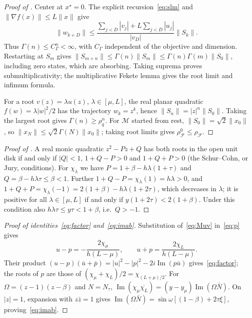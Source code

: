\documentclass[11pt]{article}
\theoremstyle{definition}
\theoremstyle{remark}
\newcommand{\cF}{\mathcal F}
\newcommand{\cM}{\mathcal M}
\newcommand{\Ima}{\operatorname{Im}}
\newcommand{\norm}[1]{\lVert #1\rVert}
\newcommand{\rhoF}{\rho_{\cF}}
\newcommand{\rhoz}{\rho_{\cF}^{0}}
\begin{document}
\begin{proof}[Proof of ]
Center at \(x^\star=0\).  The explicit recursion~\eqref{eq:slm} and
\(\norm{\nabla f(x)}\le L\norm x\) give
\[
\norm{w_{k+D}}\le
\frac{\sum_{j<D}|v_j|+L\sum_{j<D}|u_j|}{|v_D|}\norm{S_k}.
\]
Thus \(\Gamma(n)\le C_\Gamma^n<\infty\), with \(C_\Gamma\) independent of the objective and dimension.
Restarting at \(S_m\) gives
\(\norm{S_{m+n}}\le\Gamma(n)\norm{S_m}\le\Gamma(n)\Gamma(m)\norm{S_0}\),
including zero states, which are absorbing.
Taking suprema proves submultiplicativity; the multiplicative Fekete lemma gives the root limit and infimum formula.

For a root \(v(z)=\lambda u(z)\), \(\lambda\in[\mu,L]\), the real planar quadratic
\(f(w)=\lambda|w|^2/2\) has the trajectory \(w_k=z^k\), hence
\(\norm{S_n}=|z|^n\norm{S_0}\).  Taking the largest root gives \(\Gamma(n)\ge\rho_q^n\).
For \(\cM\) started from rest, \(\norm{S_0}=\sqrt2\norm{x_0}\), so
\(\norm{x_N}\le\sqrt2\Gamma(N)\norm{x_0}\); taking root limits gives \(\rhoz\le\rhoF\).
\end{proof}

\begin{proof}[Proof of ]
A real monic quadratic \(z^2-Pz+Q\) has both roots in the open unit disk if and
only if \(|Q|<1\), \(1+Q-P>0\) and \(1+Q+P>0\) (the Schur--Cohn, or Jury,
conditions).  For \(\chi_\lambda\) we have \(P=1+\beta-h\lambda(1+\tau)\) and
\(Q=\beta-h\lambda\tau\le\beta<1\).  Further \(1+Q-P=\chi_\lambda(1)=h\lambda>0\), and
\(1+Q+P=\chi_\lambda(-1)=2(1+\beta)-h\lambda(1+2\tau)\), which decreases in \(\lambda\); it is
positive for all \(\lambda\in[\mu,L]\) if and only if \(y(1+2\tau)<2(1+\beta)\).  Under this
condition also \(h\lambda\tau\le y\tau<1+\beta\), i.e.\ \(Q>-1\).
\end{proof}

\begin{proof}[Proof of identities~\eqref{eq:factor} and~\eqref{eq:imab}]
Substitution of~\eqref{eq:Muv} in~\eqref{eq:p} gives
\[
u-p=-\frac{2\chi_\mu}{h(L-\mu)},\qquad
u+p=\frac{2\chi_L}{h(L-\mu)}.
\]
Their product \((u-p)(\bar u+\bar p)=|u|^2-|p|^2-2i\Ima(p\bar u)\) gives~\eqref{eq:factor};
the roots of \(p\) are those of \((\chi_\mu+\chi_L)/2=\chi_{(L+\mu)/2}\).
For \(\Omega=(z-1)(z-\beta)\) and \(N=N_\tau\),
\(\Ima(\chi_\mu\overline{\chi_L})=(y-y_\mu)\Ima(\Omega\bar N)\).
On \(|z|=1\), expansion with \(z\bar z=1\) gives
\(\Ima(\Omega\bar N)=\sin\omega[(1-\beta)+2\tau\xi]\), proving~\eqref{eq:imab}.
\end{proof}
\end{document}
